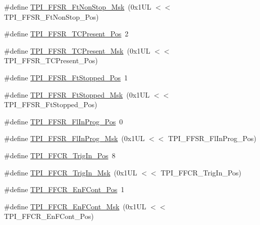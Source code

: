 \begin{DoxyCompactItemize}
\item 
\#define \mbox{\hyperlink{group___c_m_s_i_s___t_p_i_gaaa313f980974a8cfc7dac68c4d805ab1}{T\+P\+I\+\_\+\+F\+F\+S\+R\+\_\+\+Ft\+Non\+Stop\+\_\+\+Msk}}~(0x1\+U\+L $<$$<$ T\+P\+I\+\_\+\+F\+F\+S\+R\+\_\+\+Ft\+Non\+Stop\+\_\+\+Pos)
\item 
\#define \mbox{\hyperlink{group___c_m_s_i_s___t_p_i_gad30fde0c058da2ffb2b0a213be7a1b5c}{T\+P\+I\+\_\+\+F\+F\+S\+R\+\_\+\+T\+C\+Present\+\_\+\+Pos}}~2
\item 
\#define \mbox{\hyperlink{group___c_m_s_i_s___t_p_i_ga0d6bfd263ff2fdec72d6ec9415fb1135}{T\+P\+I\+\_\+\+F\+F\+S\+R\+\_\+\+T\+C\+Present\+\_\+\+Msk}}~(0x1\+U\+L $<$$<$ T\+P\+I\+\_\+\+F\+F\+S\+R\+\_\+\+T\+C\+Present\+\_\+\+Pos)
\item 
\#define \mbox{\hyperlink{group___c_m_s_i_s___t_p_i_gaedf31fd453a878021b542b644e2869d2}{T\+P\+I\+\_\+\+F\+F\+S\+R\+\_\+\+Ft\+Stopped\+\_\+\+Pos}}~1
\item 
\#define \mbox{\hyperlink{group___c_m_s_i_s___t_p_i_ga1ab6c3abe1cf6311ee07e7c479ce5f78}{T\+P\+I\+\_\+\+F\+F\+S\+R\+\_\+\+Ft\+Stopped\+\_\+\+Msk}}~(0x1\+U\+L $<$$<$ T\+P\+I\+\_\+\+F\+F\+S\+R\+\_\+\+Ft\+Stopped\+\_\+\+Pos)
\item 
\#define \mbox{\hyperlink{group___c_m_s_i_s___t_p_i_ga542ca74a081588273e6d5275ba5da6bf}{T\+P\+I\+\_\+\+F\+F\+S\+R\+\_\+\+Fl\+In\+Prog\+\_\+\+Pos}}~0
\item 
\#define \mbox{\hyperlink{group___c_m_s_i_s___t_p_i_ga63dfb09259893958962914fc3a9e3824}{T\+P\+I\+\_\+\+F\+F\+S\+R\+\_\+\+Fl\+In\+Prog\+\_\+\+Msk}}~(0x1\+U\+L $<$$<$ T\+P\+I\+\_\+\+F\+F\+S\+R\+\_\+\+Fl\+In\+Prog\+\_\+\+Pos)
\item 
\#define \mbox{\hyperlink{group___c_m_s_i_s___t_p_i_gaa7ea11ba6ea75b541cd82e185c725b5b}{T\+P\+I\+\_\+\+F\+F\+C\+R\+\_\+\+Trig\+In\+\_\+\+Pos}}~8
\item 
\#define \mbox{\hyperlink{group___c_m_s_i_s___t_p_i_ga360b413bc5da61f751546a7133c3e4dd}{T\+P\+I\+\_\+\+F\+F\+C\+R\+\_\+\+Trig\+In\+\_\+\+Msk}}~(0x1\+U\+L $<$$<$ T\+P\+I\+\_\+\+F\+F\+C\+R\+\_\+\+Trig\+In\+\_\+\+Pos)
\item 
\#define \mbox{\hyperlink{group___c_m_s_i_s___t_p_i_ga99e58a0960b275a773b245e2b69b9a64}{T\+P\+I\+\_\+\+F\+F\+C\+R\+\_\+\+En\+F\+Cont\+\_\+\+Pos}}~1
\item 
\#define \mbox{\hyperlink{group___c_m_s_i_s___t_p_i_ga27d1ecf2e0ff496df03457a2a97cb2c9}{T\+P\+I\+\_\+\+F\+F\+C\+R\+\_\+\+En\+F\+Cont\+\_\+\+Msk}}~(0x1\+U\+L $<$$<$ T\+P\+I\+\_\+\+F\+F\+C\+R\+\_\+\+En\+F\+Cont\+\_\+\+Pos)
\item 

\end{DoxyCompactItemize}
